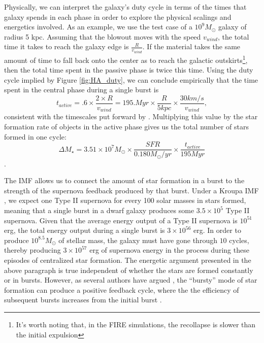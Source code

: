 \documentclass[iop]{emulateapj}
\begin{document}
Physically, we can interpret the galaxy's duty cycle in terms of the times that galaxy spends in each phase in order to explore the physical scalings and energetics involved. As an example, we use the test case of a $10^9 M_{\odot}$ galaxy of radius 5 kpc. Assuming that the blowout moves with the speed $v_{wind}$, the total time it takes to reach the galaxy edge is $\frac{R}{v_{wind}}$. If the material takes the same amount of time to fall back onto the center as to reach the galactic outskirts\footnote{It's worth noting that, in the FIRE simulations, the recollapse is slower than the initial expulsion}, then the total time spent in the passive phase is twice this time. Using the duty cycle implied by Figure \ref{fig:HA_duty}, we can conclude empirically that the time spent in the central phase during a single burst is $$t_{active} = .6 \times\frac{2 \times R}{v_{wind}} = 195. Myr \times \frac{R}{5 kpc}\times \frac{30 km/s}{v_{wind}},  $$ consistent with the timescales put forward by \cite{EB17}. Multiplying this value by the star formation rate of objects in the active phase gives us the total number of stars formed in one cycle:
$$\Delta M_{\star} = 3.51 \times 10^7 M_{\odot} \times \frac{SFR}{0.180 M_{\odot}/yr} \times \frac{t_{active}}{195 Myr}$$.

The IMF allows us to connect the amount of star formation in a burst to the strength of the supernova feedback produced by that burst. Under a Kroupa IMF \citep{Kroupa02}, we expect one Type II supernova for every 100 solar masses in stars formed, meaning that a single burst in a dwarf galaxy produces some $3.5 \times 10^5$ Type II supernova. Given that the average energy output of a Type II supernova is $10^{51}$ erg, the total energy output during a single burst is $3 \times 10^{56}$ erg. In order to produce $10^8.5 M_{\odot}$ of stellar mass, the galaxy must have gone through $10$ cycles, thereby producing $3 \times 10^{57}$ erg of supernova energy in the process during these episodes of centralized star formation. The energetic argument presented in the above paragraph is true independent of whether the stars are formed constantly or in bursts. However, as several authors have argued \citep{Governato12,GK13}, the ``bursty'' mode of star formation can produce a positive feedback cycle, where the the efficiency of subsequent bursts increases from the initial burst \cite[see][]{Pontzen12,Governato12}. 
\end{document}
